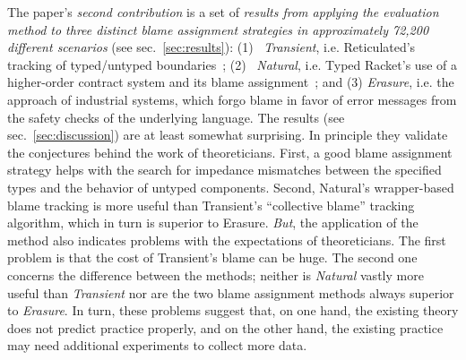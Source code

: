 The paper's {\it second contribution\/} is a set of {\em results from applying
the evaluation method to three distinct blame assignment strategies in
approximately 72,200 different scenarios\/} (see sec.~\ref{sec:results}): (1)~{\it
Transient\/}, i.e. Reticulated's tracking of typed/untyped boundaries~\cite{vss-popl-2017}; (2)~{\it
Natural\/}, i.e. Typed Racket's use of a higher-order contract system and its blame
assignment~\cite{ff-icfp-2002}; and (3) {\it Erasure\/}, i.e. the approach of
industrial systems, which forgo blame in favor of error messages from the safety
checks of the underlying language. The results (see
sec.~\ref{sec:discussion}) are at least somewhat surprising.  In principle
they validate the conjectures behind the work of theoreticians.  First, a good
blame assignment strategy helps with the search for impedance mismatches between
the specified types and the behavior of untyped components.  Second, Natural's
wrapper-based blame tracking is more useful than Transient's ``collective
blame'' tracking algorithm, which in turn is superior to Erasure. {\em But\/},
the application of the method also indicates problems with the expectations of
theoreticians. The first problem is that the cost of Transient's blame can be
huge. The second one concerns the difference between the methods; neither is
{\it Natural\/} vastly more useful than {\it Transient\/} nor are the two blame
assignment methods always superior to {\it Erasure\/}.  In turn, these
problems suggest that, on one hand, the existing theory does not predict
practice properly, and on the other hand, the existing practice may need
additional experiments to collect more data.

